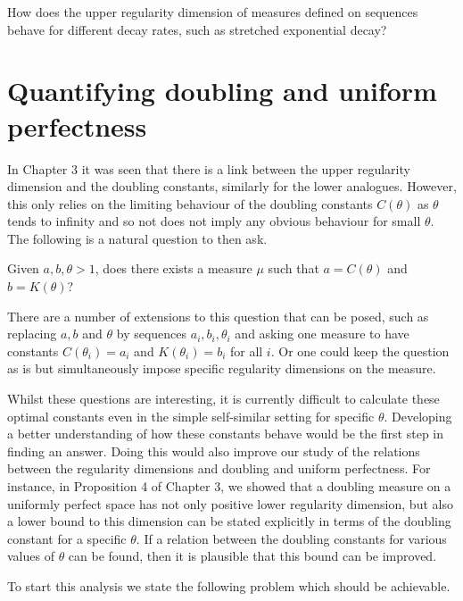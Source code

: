\begin{question}
How does the upper regularity dimension of measures defined on sequences behave for different decay rates, such as stretched exponential decay?
\end{question}



\section{Quantifying doubling and uniform perfectness}\label{ch-conclusion:quant}


In Chapter 3 it was seen that there is a link between the upper regularity dimension and the doubling constants, similarly for the lower analogues. However, this only relies on the limiting behaviour of the doubling constants $C(\theta)$ as $\theta$ tends to infinity and so not does not imply any obvious behaviour for small $\theta$. The following is a natural question to then ask.
\begin{question}
Given $a, b , \theta > 1$, does there exists a measure $\mu$ such that $a = C(\theta)$ and $b = K(\theta)$?
\end{question}  
There are a number of extensions to this question that can be posed, such as replacing $a, b$ and $\theta$ by sequences $a_i,b_i,\theta_i$ and asking one measure to have constants $C(\theta_i) = a_i$ and $K(\theta_i) = b_i$ for all $i$. Or one could keep the question as is but simultaneously impose specific regularity dimensions on the measure. 

Whilst these questions are interesting, it is currently difficult to calculate these optimal constants even in the simple self-similar setting for specific $\theta$. Developing a better understanding of how these constants behave would be the first step in finding an answer. Doing this would also improve our study of the relations between the regularity dimensions and doubling and uniform perfectness. For instance, in Proposition 4 of Chapter 3, we showed that a doubling measure on a uniformly perfect space has not only positive lower regularity dimension, but also a lower bound to this dimension can be stated explicitly in terms of the doubling constant for a specific $\theta$. If a relation between the doubling constants for various values of $\theta$ can be found, then it is plausible that this bound can be improved. 

To start this analysis we state the following problem which should be achievable.

